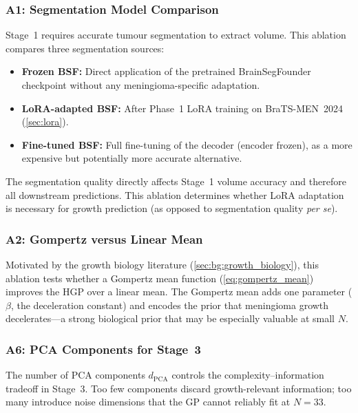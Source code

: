 \subsubsection{A1: Segmentation Model Comparison}

Stage~1 requires accurate tumour segmentation to extract volume. This
ablation compares three segmentation sources:
\begin{itemize}[leftmargin=*]
  \item \textbf{Frozen BSF:} Direct application of the pretrained
    BrainSegFounder checkpoint without any meningioma-specific adaptation.
  \item \textbf{LoRA-adapted BSF:} After Phase~1 LoRA training on
    BraTS-MEN~2024 (\cref{sec:lora}).
  \item \textbf{Fine-tuned BSF:} Full fine-tuning of the decoder (encoder
    frozen), as a more expensive but potentially more accurate alternative.
\end{itemize}
The segmentation quality directly affects Stage~1 volume accuracy and
therefore all downstream predictions. This ablation determines whether LoRA
adaptation is necessary for growth prediction (as opposed to segmentation
quality \textit{per se}).

\subsubsection{A2: Gompertz versus Linear Mean}

Motivated by the growth biology literature (\cref{sec:bg:growth_biology}),
this ablation tests whether a Gompertz mean function
(\cref{eq:gompertz_mean}) improves the HGP over a linear mean. The Gompertz
mean adds one parameter ($\beta$, the deceleration constant) and encodes the
prior that meningioma growth decelerates---a strong biological prior that may
be especially valuable at small $N$.

\subsubsection{A6: PCA Components for Stage~3}

The number of PCA components $d_{\text{PCA}}$ controls the
complexity--information tradeoff in Stage~3. Too few components discard
growth-relevant information; too many introduce noise dimensions that the
GP cannot reliably fit at $N = 33$.

